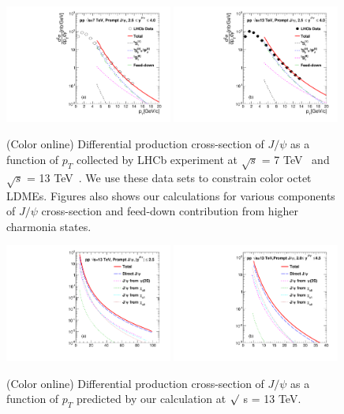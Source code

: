 \documentclass[aps,prc,preprint,superscriptaddress,showpacs,showkeys,amsmath]{revtex4-1}
\begin{document}
\begin{figure}
\includegraphics[width=0.49\textwidth]{Figures/JPsi/LHCb_RootS7TeV_D2NDPtDy_PromptJPsi_Y2035_Pt.pdf}
\includegraphics[width=0.49\textwidth]{Figures/JPsi/LHCb_RootS13TeV_D2NDPtDy_PromptJPsi_Y2045_Pt.pdf}
\caption{(Color online) Differential production cross-section of $J/\psi$ 
as a function of $p_{T}$ collected by LHCb experiment at  $\sqrt{s}$ = 7 TeV~\cite{Aaij:2011jh}
and $\sqrt{s}$ = 13 TeV~\cite{Aaij:2015rla}. We use these data sets to constrain color octet LDMEs. 
Figures also shows our calculations for various components 
of $J/\psi$ cross-section and feed-down contribution from higher charmonia states.}
\label{Fig:LDMEJPsiLHCb}
\end{figure}






\begin{figure}
\includegraphics[width=0.49\textwidth]{Figures/Predict/Fig_ATLAS_D2NDPtDy_RootS13TeV_PromptJPsi_Y2525.pdf}
\includegraphics[width=0.49\textwidth]{Figures/Predict/Fig_ALICE_D2NDPtDy_RootS13TeV_PromptJPsi_Y2045.pdf}
\caption{(Color online) Differential production cross-section of $J/\psi$ as a function of $p_{T}$ 
  predicted by our calculation at $\surd$ s = 13 TeV.}
\label{Fig:SigmaJPsi}
\end{figure}
\end{document}
